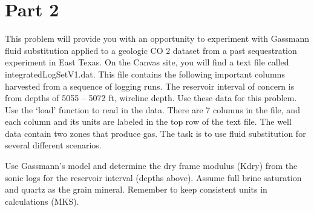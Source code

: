 
\section{Part 2}
This problem will provide you with an opportunity to experiment with Gassmann fluid substitution applied to a geologic CO 2 dataset from a past sequestration experiment in East Texas. On the Canvas site, you will find a text file called integratedLogSetV1.dat. This file contains the following important columns harvested from a sequence of logging runs.
The reservoir interval of concern is from depths of 5055 – 5072 ft, wireline depth.
Use these data for this problem. Use the ‘load’ function to read in the data. There are 7 columns in the file, and each column and its units are labeled in the top row of the text file. The well data contain two zones that produce gas. The task is to use fluid substitution for several different scenarios.


\begin{problem}{1}
    Use Gassmann’s model and determine the dry frame modulus (Kdry) from the sonic logs for the reservoir interval (depths above). Assume full brine saturation and quartz as the grain mineral. Remember to keep consistent units in calculations (MKS).
\end{problem}

